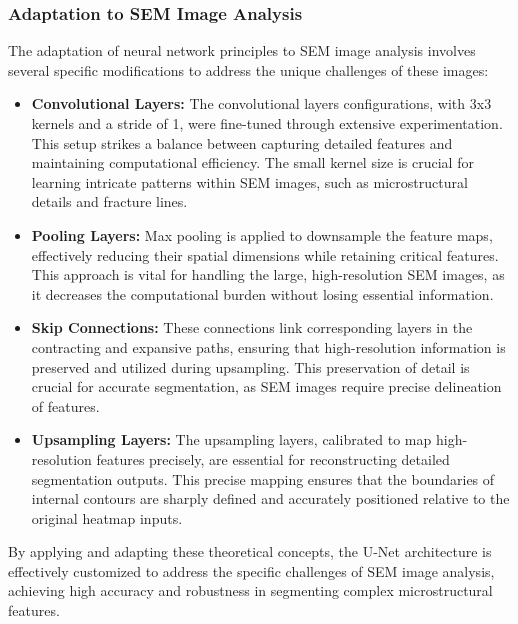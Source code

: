 \documentclass[preprint,12pt]{elsarticle}
\begin{document}
\subsubsection{Adaptation to SEM Image Analysis}
The adaptation of neural network principles to SEM image analysis involves several specific modifications to address the unique challenges of these images:

\begin{itemize}
    \item \textbf{Convolutional Layers:} The convolutional layers configurations, with 3x3 kernels and a stride of 1, were fine-tuned through extensive experimentation. This setup strikes a balance between capturing detailed features and maintaining computational efficiency. The small kernel size is crucial for learning intricate patterns within SEM images, such as microstructural details and fracture lines.

    \item \textbf{Pooling Layers:} Max pooling is applied to downsample the feature maps, effectively reducing their spatial dimensions while retaining critical features. This approach is vital for handling the large, high-resolution SEM images, as it decreases the computational burden without losing essential information.

    \item \textbf{Skip Connections:} These connections link corresponding layers in the contracting and expansive paths, ensuring that high-resolution information is preserved and utilized during upsampling. This preservation of detail is crucial for accurate segmentation, as SEM images require precise delineation of features.

    \item \textbf{Upsampling Layers:} The upsampling layers, calibrated to map high-resolution features precisely, are essential for reconstructing detailed segmentation outputs. This precise mapping ensures that the boundaries of internal contours are sharply defined and accurately positioned relative to the original heatmap inputs.
\end{itemize}

By applying and adapting these theoretical concepts, the U-Net architecture is effectively customized to address the specific challenges of SEM image analysis, achieving high accuracy and robustness in segmenting complex microstructural features.
\end{document}
